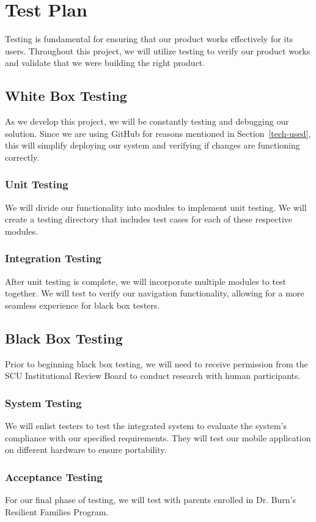 \chapter{Test Plan} \label{test-plan} %
Testing is fundamental for ensuring that our product works effectively for its users. Throughout this project, we will utilize testing to verify our product works and validate that we were building the right product. 

\section{White Box Testing}

As we develop this project, we will be constantly testing and debugging our solution. Since we are using GitHub for reasons mentioned in Section~\ref{tech-used}, this will simplify deploying our system and verifying if changes are functioning correctly.

\subsection{Unit Testing}
    We will divide our functionality into modules to implement unit testing. We will create a testing directory that includes test cases for each of these respective modules.
\subsection{Integration Testing}
    After unit testing is complete, we will incorporate multiple modules to test together. We will test to verify our navigation functionality, allowing for a more seamless experience for black box testers.
\section{Black Box Testing}

Prior to beginning black box testing, we will need to receive permission from the SCU Institutional Review Board to conduct research with human participants.
\subsection{System Testing}
    We will enlist testers to test the integrated system to evaluate the system’s compliance with our specified requirements. They will test our mobile application on different hardware to ensure portability.
\subsection{Acceptance Testing}
    For our final phase of testing, we will test with parents enrolled in Dr. Burn's Resilient Families Program.